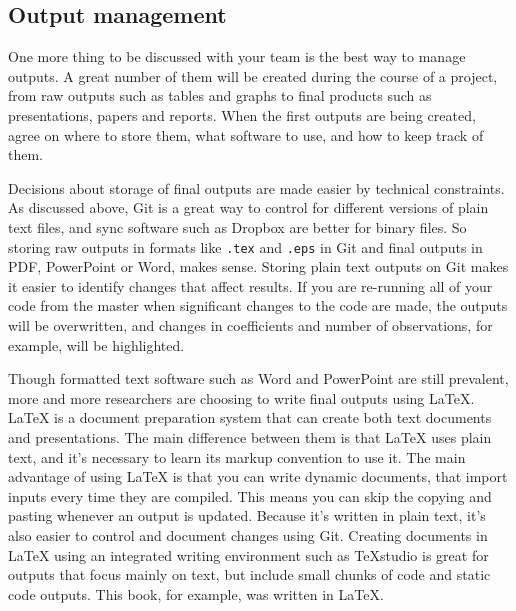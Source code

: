 \subsection{Output management}

One more thing to be discussed with your team is the best way to manage outputs. 
A great number of them will be created during the course of a project, 
from raw outputs such as tables and graphs to final products such as presentations, papers and reports.
When the first outputs are being created, agree on where to store them,
what software to use, and how to keep track of them.

Decisions about storage of final outputs are made easier by technical constraints. 
As discussed above, Git is a great way to control for different versions of 
plain text files, and sync software such as Dropbox are better for binary files.
So storing raw outputs in formats like \texttt{.tex} and \texttt{.eps} in Git and 
final outputs in PDF, PowerPoint or Word, makes sense.
Storing plain text outputs on Git makes it easier to identify changes that affect results.
If you are re-running all of your code from the master when significant changes to the code are made,
the outputs will be overwritten, and changes in coefficients and number of observations, for example, 
will be highlighted.

Though formatted text software such as Word and PowerPoint are still prevalent, 
more and more researchers are choosing to write final outputs using  
\LaTeX{}.
{\LaTeX} is a document preparation system that can create both text documents and presentations.
The main difference between them is that {\LaTeX} uses plain text, 
and it's necessary to learn its markup convention to use it. 
The main advantage of using {\LaTeX} is that you can write dynamic documents, 
that import inputs every time they are compiled. 
This means you can skip the copying and pasting whenever an output is updated. 
Because it's written in plain text, it's also easier to control and document changes using Git. 
Creating documents in {\LaTeX} using an integrated writing environment such as TeXstudio 
is great for outputs that focus mainly on text,
but include small chunks of code and static code outputs.
This book, for example, was written in \LaTeX.

